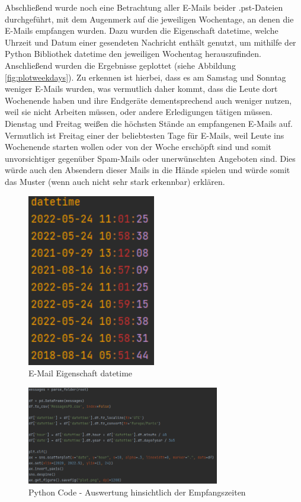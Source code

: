 Abschließend wurde noch eine Betrachtung aller E-Mails beider .pst-Dateien durchgeführt, mit dem Augenmerk auf die jeweiligen Wochentage, an denen die E-Mails empfangen wurden. Dazu wurden die Eigenschaft \glqq{}datetime\grqq{}, welche Uhrzeit und Datum einer gesendeten Nachricht enthält genutzt, um mithilfe der Python Bibliothek datetime den jeweiligen Wochentag herauszufinden. Anschließend wurden die Ergebnisse geplottet (siehe Abbildung \ref{fig:plotweekdays}). Zu erkennen ist hierbei, dass es am Samstag und Sonntag weniger E-Mails wurden, was vermutlich daher kommt, dass die Leute dort Wochenende haben und ihre Endgeräte dementsprechend auch weniger nutzen, weil sie nicht Arbeiten müssen, oder andere Erledigungen tätigen müssen. Dienstag und Freitag weißen die höchsten Stände an empfangenen E-Mails auf. Vermutlich ist Freitag einer der beliebtesten Tage für E-Mails, weil Leute ins Wochenende starten wollen oder von der Woche erschöpft sind und somit unvorsichtiger gegenüber Spam-Mails oder unerwünschten Angeboten sind. Dies würde auch den Absendern dieser Mails in die Hände spielen und würde somit das Muster (wenn auch nicht sehr stark erkennbar) erklären.

\begin{figure}
    \centering
    \includegraphics[width=0.50\textwidth]{images/datetime.PNG}
    \caption{E-Mail Eigenschaft datetime} 
    \label{fig:datetime}
\end{figure}

\begin{figure}
    \centering
    \includegraphics[width=0.75\textwidth]{images/Auswertung_Zeiten.PNG}
    \caption{Python Code - Auswertung hinsichtlich der Empfangszeiten} 
    \label{fig:emailsdatetime}
\end{figure}


